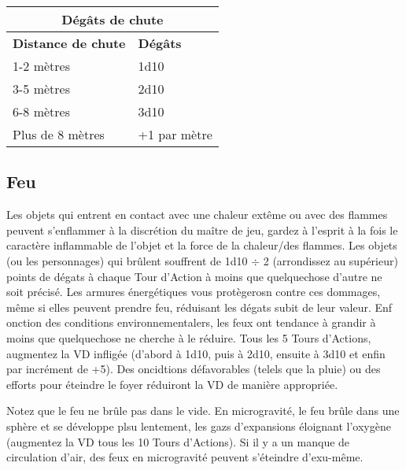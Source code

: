 \begin{table} \begin{tabular}{|l|l|} \hline

\multicolumn{2}{|c|}{\textbf{Dégâts de chute}}	\\ \hline

\textbf{Distance de chute}	&\textbf{Dégâts}	\\ \hline

1-2 mètres	&1d10	\\ \hline

3-5 mètres	&2d10	\\ \hline

6-8 mètres	&3d10	\\ \hline

Plus de 8 mètres	&+1 par mètre	\\ \hline

\end{tabular} \label{tab:falling-damage} \end{table} 

\subsection{Feu} \label{sec:fire} 

Les objets qui entrent en contact avec une chaleur extême ou avec des flammes peuvent s'enflammer à la discrétion du maître de jeu, gardez à l'esprit à la fois le caractère inflammable de l'objet et la force de la chaleur/des flammes. Les objets (ou les personnages) qui brûlent souffrent de 1d10 $\div$ 2 (arrondissez au supérieur) points de dégats à chaque Tour d'Action à moins que quelquechose d'autre ne soit précisé. Les armures énergétiques vous protègerosn contre ces dommages, même si elles peuvent prendre feu, réduisant les dégats subit de leur valeur. Enf onction des conditions environnementalers, les feux ont tendance à grandir à moins que quelquechose ne cherche à le réduire. Tous les 5 Tours d'Actions, augmentez la VD infligée (d'abord à 1d10, puis à 2d10, ensuite à 3d10 et enfin par incrément de +5). Des oncidtions défavorables (telels que la pluie) ou des efforts pour éteindre le foyer réduiront la VD de manière appropriée. 

Notez que le feu ne brûle pas dans le vide. En microgravité, le feu brûle dans une sphère et se développe plsu lentement, les gazs d'expansions éloignant l'oxygène (augmentez la VD tous les 10 Tours d'Actions). Si il y a un manque de circulation d'air, des feux en microgravité peuvent s'éteindre d'exu-même. 

